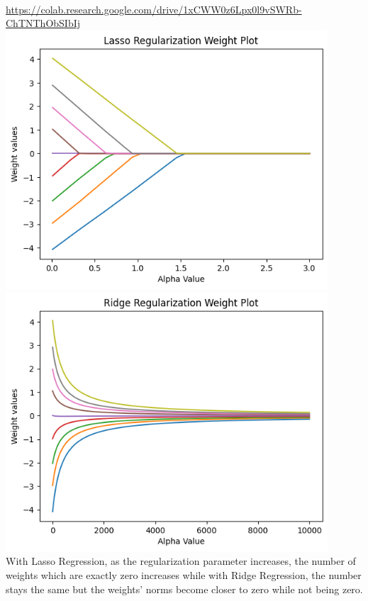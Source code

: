 \begin{solution}
  \\
  \url{https://colab.research.google.com/drive/1xCWW0z6Lpx0l9vSWRb-ChTNThObSIbIj}
  \\
  \includegraphics[width=12cm]{images/P3_A_lasso.png} \\
  \includegraphics[width=12cm]{images/P3_A_ridge.png} \\

  With Lasso Regression, as the regularization parameter increases, the number of weights which are exactly zero increases while with Ridge Regression, the number stays the same but the weights' norms become closer to zero while not being zero.
\end{solution}

